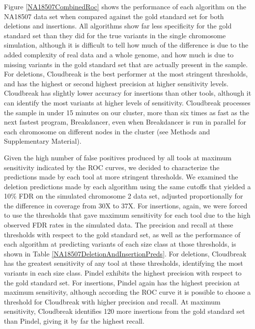\documentclass[11pt]{article}
\begin{document}
Figure \ref{NA18507CombinedRoc} shows the performance of each algorithm on the NA18507 data set when compared against the gold standard set for both deletions and insertions. All algorithms show far less specificity for the gold standard set than they did for the true variants in the single chromosome simulation, although it is difficult to tell how much of the difference is due to the added complexity of real data and a whole genome, and how much is due to missing variants in the gold standard set that are actually present in the sample. For deletions, Cloudbreak is the best performer at the most stringent thresholds, and has the highest or second highest precision at higher sensitivity levels. Cloudbreak has slightly lower accuracy for insertions than other tools, although it can identify the most variants at higher levels of sensitivity. Cloudbreak processes the sample in under 15 minutes on our cluster, more than six times as fast as the next fastest program, Breakdancer, even when Breakdancer is run in parallel for each chromosome on different nodes in the cluster (see Methods and Supplementary Material).

Given the high number of false positives produced by all tools at maximum sensitivity indicated by the ROC curves, we decided to characterize the predictions made by each tool at more stringent thresholds. We examined the deletion predictions made by each algorithm using the same cutoffs that yielded a 10\% FDR on the simulated chromosome 2 data set, adjusted proportionally for the difference in coverage from 30X to 37X. For insertions, again, we were forced to use the thresholds that gave maximum sensitivity for each tool due to the high observed FDR rates in the simulated data. The precision and recall at these thresholds with respect to the gold standard set, as well as the performance of each algorithm at predicting variants of each size class at those thresholds, is shown in Table \ref{NA18507DeletionAndInsertionPreds}. For deletions, Cloudbreak has the greatest sensitivity of any tool at these thresholds, identifying the most variants in each size class. Pindel exhibits the highest precision with respect to the gold standard set. For insertions, Pindel again has the highest precision at maximum sensitivity, although according the ROC curve it is possible to choose a threshold for Cloudbreak with higher precision and recall. At maximum sensitivity, Cloudbreak identifies 120 more insertions from the gold standard set than Pindel, giving it by far the highest recall.
\end{document}
